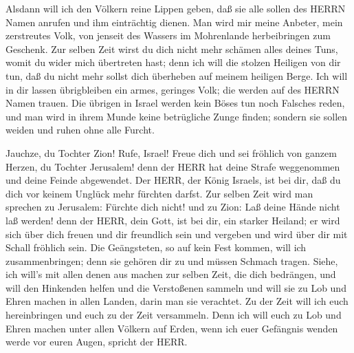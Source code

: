  Alsdann will ich den Völkern reine Lippen geben, daß sie
alle sollen des HERRN Namen anrufen und ihm einträchtig dienen.
 Man wird mir meine Anbeter, mein zerstreutes Volk, von
jenseit des Wassers im Mohrenlande herbeibringen zum Geschenk.
 Zur selben Zeit wirst du dich nicht mehr schämen alles
deines Tuns, womit du wider mich übertreten hast; denn ich will die
stolzen Heiligen von dir tun, daß du nicht mehr sollst dich überheben
auf meinem heiligen Berge.  Ich will in dir lassen
übrigbleiben ein armes, geringes Volk; die werden auf des HERRN Namen
trauen.  Die übrigen in Israel werden kein Böses tun noch
Falsches reden, und man wird in ihrem Munde keine betrügliche Zunge
finden; sondern sie sollen weiden und ruhen ohne alle Furcht.

 Jauchze, du Tochter Zion! Rufe, Israel! Freue dich und sei
fröhlich von ganzem Herzen, du Tochter Jerusalem!  denn der
HERR hat deine Strafe weggenommen und deine Feinde abgewendet. Der HERR,
der König Israels, ist bei dir, daß du dich vor keinem Unglück mehr
fürchten darfst.  Zur selben Zeit wird man sprechen zu
Jerusalem: Fürchte dich nicht! und zu Zion: Laß deine Hände nicht laß
werden!  denn der HERR, dein Gott, ist bei dir, ein starker
Heiland; er wird sich über dich freuen und dir freundlich sein und
vergeben und wird über dir mit Schall fröhlich sein.  Die
Geängsteten, so auf kein Fest kommen, will ich zusammenbringen; denn sie
gehören dir zu und müssen Schmach tragen.  Siehe, ich
will's mit allen denen aus machen zur selben Zeit, die dich bedrängen,
und will den Hinkenden helfen und die Verstoßenen sammeln und will sie
zu Lob und Ehren machen in allen Landen, darin man sie verachtet.
 Zu der Zeit will ich euch hereinbringen und euch zu der
Zeit versammeln. Denn ich will euch zu Lob und Ehren machen unter allen
Völkern auf Erden, wenn ich euer Gefängnis wenden werde vor euren Augen,
spricht der HERR.
